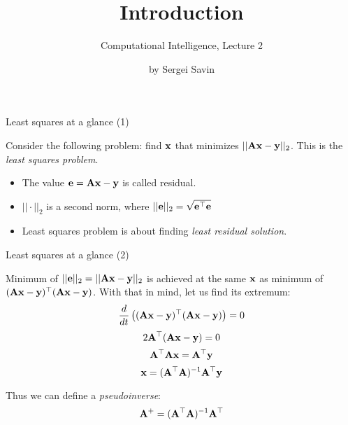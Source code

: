 \documentclass{beamer}
\title{Introduction}
\subtitle{Computational Intelligence, Lecture 2}
\author{by Sergei Savin}
\date{\mydate}
\begin{document}
\maketitle



\begin{frame}{Least squares at a glance (1)}
	\begin{flushleft}
		
		Consider the following problem: find $\mathbf{x}$ that minimizes $|| \mathbf{A}\mathbf{x} - \mathbf{y} ||_2$. This is the \emph{least squares problem}. 
		
		\bigskip
		
		\begin{itemize}
			\item The value $\mathbf{e} = \mathbf{A}\mathbf{x} - \mathbf{y}$ is called residual.
			
			\item $|| \cdot ||_2$ is a second norm, where $|| \mathbf{e} ||_2 = \sqrt{\mathbf{e}^\top\mathbf{e}}$
			
			\item Least squares problem is about finding \emph{least residual solution}.
		\end{itemize}
		
		
		
	\end{flushleft}
\end{frame}




\begin{frame}{Least squares at a glance (2)}
	\begin{flushleft}
		
		Minimum of $||\mathbf{e}||_2 = ||\mathbf{A}\mathbf{x} - \mathbf{y}||_2$ is achieved at the same $\mathbf{x}$ as minimum of $(\mathbf{A}\mathbf{x} - \mathbf{y})^\top(\mathbf{A}\mathbf{x} - \mathbf{y})$. With that in mind, let us find its extremum:
		\begin{equation}
			\frac{d}{dt} \left( (\mathbf{A}\mathbf{x} - \mathbf{y})^\top(\mathbf{A}\mathbf{x} - \mathbf{y}) \right) 
			= 0
		\end{equation}
		\begin{equation}
			2\mathbf{A}^\top(\mathbf{A}\mathbf{x} - \mathbf{y}) = 0
		\end{equation}
		\begin{equation}
			\mathbf{A}^\top\mathbf{A}\mathbf{x} = \mathbf{A}^\top\mathbf{y}
		\end{equation}
		\begin{equation}
			\mathbf{x} = (\mathbf{A}^\top\mathbf{A})^{-1} \mathbf{A}^\top\mathbf{y}
		\end{equation}
		
		Thus we can define a \emph{pseudoinverse}:
		\begin{equation}
			\mathbf{A}^+ = (\mathbf{A}^\top\mathbf{A})^{-1} \mathbf{A}^\top
		\end{equation}
		
		
	\end{flushleft}
\end{frame}
\end{document}

